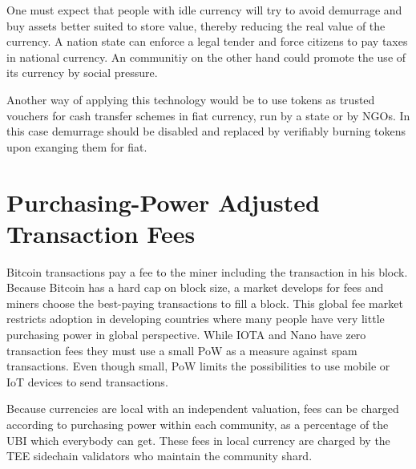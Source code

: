 \documentclass[conference]{IEEEtran}
\begin{document}


One must expect that people with idle currency will try to avoid demurrage and buy assets better suited to store value, thereby reducing the real value of the \encointer currency. A nation state can enforce a legal tender and force citizens to pay taxes in national currency. An \encointer communitiy on the other hand could promote the use of its currency by social pressure. 

Another way of applying this technology would be to use \encointer tokens as trusted vouchers for cash transfer schemes in fiat currency, run by a state or by NGOs. In this case demurrage should be disabled and replaced by verifiably burning tokens upon exanging them for fiat.

\section{Purchasing-Power Adjusted Transaction Fees}\label{sec:fees}

Bitcoin transactions pay a fee to the miner including the transaction in his block. Because Bitcoin has a hard cap on block size, a market develops for fees and miners choose the best-paying transactions to fill a block. This global fee market restricts adoption in developing countries where many people have very little purchasing power in global perspective. While IOTA \cite{iota} and Nano \cite{nano} have zero transaction fees they must use a small PoW as a measure against spam transactions. Even though small, PoW limits the possibilities to use mobile or IoT devices to send transactions.

Because \encointer currencies are local with an independent valuation, fees can be charged according to purchasing power within each community, as a percentage of the UBI which everybody can get. These fees in local currency are charged by the TEE sidechain validators who maintain the community shard. 

\end{document}
